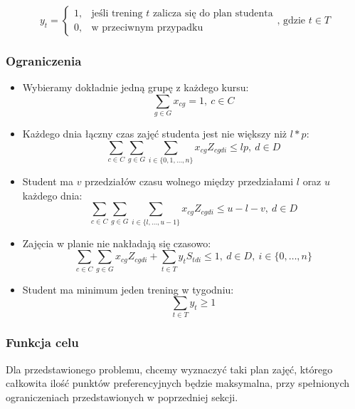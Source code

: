 \documentclass{article}
\begin{document}
        \begin{equation*}
            y_{t} =
            \begin{cases}
                1, & \text{jeśli trening $t$ zalicza się do plan studenta} \\
                0, & \text{w przeciwnym przypadku}
            \end{cases}
            \text{, gdzie $t \in T$}
        \end{equation*}
        
    \subsubsection{Ograniczenia}

        \begin{itemize}
            \item Wybieramy dokładnie jedną grupę z każdego kursu:
                $$\sum_{g \in G} x_{cg} = 1, \ c \in C$$
            
            \item Każdego dnia łączny czas zajęć studenta jest nie większy niż $l * p$:
                $$\sum_{c \in C} \sum_{g \in G} \sum_{i \in \{0,1,\dots,n\}} x_{cg} Z_{cgdi} \leq lp, \ d \in D$$
                
            \item Student ma $v$ przedziałów czasu wolnego między przedziałami $l$ oraz $u$ każdego dnia: 
                $$\sum_{c \in C} \sum_{g \in G} \sum_{i \in \{l, \dots, u-1\}} x_{cg} Z_{cgdi} \leq u - l - v, \ d \in D$$

            \item Zajęcia w planie nie nakładają się czasowo:
                $$\sum_{c \in C} \sum_{g \in G} x_{cg} Z_{cgdi} + \sum_{t \in T} y_{t} S_{tdi} \leq 1, \ d \in D, \ i \in \{0, \dots, n\}$$

            \item Student ma minimum jeden trening w tygodniu:
                $$\sum_{t \in T} y_{t} \geq 1$$

        \end{itemize}

    \subsubsection{Funkcja celu}

        Dla przedstawionego problemu, chcemy wyznaczyć taki plan zajęć, którego całkowita 
        ilość punktów preferencyjnych będzie maksymalna, przy spełnionych ograniczeniach 
        przedstawionych w poprzedniej sekcji.
\end{document}
